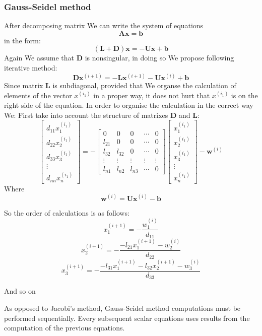 \documentclass{report}
\begin{document}
\subsubsection{Gauss-Seidel method}
After decomposing matrix We can write the system of equations
\[ \mathbf{A}\mathbf{x} = \mathbf{b} \]
in the form:
\[ (\mathbf{L}+\mathbf{D})\mathbf{x} = -\mathbf{U}\mathbf{x}+\mathbf{b}
\]
Again We assume that \textbf{D} is nonsingular, in doing so We propose following iterative method:
\[ \mathbf{D}\mathbf{x}^{(i+1)} = -\mathbf{L}\mathbf{x}^{(i+1)}-\mathbf{U}\mathbf{x}^{(i)}+\mathbf{b}
\]
Since matrix \textbf{L} is subdiagonal, provided that We organse the calculation of elements of the vector $x^{(i_1)}$ in a proper way, it does not hurt that $x^{(i_1)}$ is on the right side of the equation.
In order to organise the calculation in the correct way We:
First take into account the structure of matrixes \textbf{D} and \textbf{L}:
\[
\begin{bmatrix}
d_{11}x_1^{(i_1)}\\
d_{22}x_2^{(i_1)}\\
d_{33}x_3^{(i_1)}\\
\vdots\\
d_{nn}x_n^{(i_1)}
\end{bmatrix}
=
-
\begin{bmatrix}
0 & 0 & 0 & \cdots & 0\\
l_{21} & 0 & 0 & \cdots & 0\\
l_{32} & l_{32} & 0 & \cdots & 0\\
\vdots & \vdots & \vdots & \vdots & \vdots\\
l_{n1} & l_{n2} & l_{n3} & \cdots & 0
\end{bmatrix}
\begin{bmatrix}
x_1^{(i_1)}\\
x_2^{(i_1)}\\
x_3^{(i_1)}\\
\vdots\\
x_n^{(i_1)}
\end{bmatrix}
-
\mathbf{w}^{(i)}
\]
Where
\[ \mathbf{w}^{(i)} = \mathbf{U}\mathbf{x}^{(i)} - \mathbf{b} \]

\newpage
So the order of calculations is as follows:
\[ x_1^{(i+1)} = -\frac{w_1^{(i)}}{d_{11}} \]
\[ x_2^{(i+1)} = -\frac{-l_{21}x_1^{(i+1)} - w_2^{(i)}}{d_{22}} \]
\[ x_3^{(i+1)} = -\frac{-l_{31}x_1^{(i+1)} -l_{32}x_2^{(i+1)} - w_3^{(i)}}{d_{33}} \]

And so on

As opposed to Jacobi's method, Gauss-Seidel method computations must be performed sequentially. Every subsequent scalar equations uses results from the computation of the previous equations.
\end{document}
